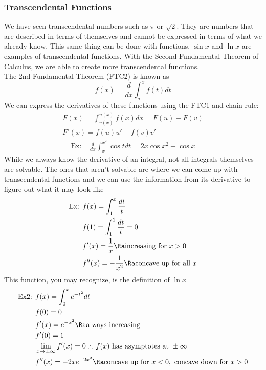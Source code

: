 \subsubsection{Transcendental Functions}
We have seen transcendental numbers such as $\pi$ or $\sqrt{2}$. They are numbers that are described in terms of themselves and cannot be expressed in terms of what we already know. This same thing can be done with functions. $\sin x$ and $\ln x$ are examples of transcendental functions. With the Second Fundamental Theorem of Calculus, we are able to create more transcendental functions.\\
The 2nd Fundamental Theorem (FTC2) is known as
$$f(x)=\frac{d}{dx}\int_a^xf(t)dt$$
We can express the derivatives of these functions using the FTC1 and chain rule:\\
\begin{align*}
    F(x)=\displaystyle{\int^{u(x)}_{v(x)}f(x)dx}=F(u)-F(v)\\
    F'(x)=f(u)u'-f(v)v'
\end{align*}
\begin{align*}
    \text{Ex: }&\frac{d}{dx}\int_x^{x^2}\cos t dt=2x\cos x^2-\cos x
\end{align*}
While we always know the derivative of an integral, not all integrals themselves are solvable. The ones that aren't solvable are where we can come up with transcendental functions and we can use the information from its derivative to figure out what it may look like
\begin{align*}
    \text{Ex: }&f(x)=\int_1^x\frac{dt}{t}\\
    &f(1)=\int_1^1\frac{dt}{t}=0\\
    &f'(x)=\frac{1}{x}\Ra\text{increasing for }x>0\\
    &f''(x)=-\frac{1}{x^2}\Ra\text{concave up for all }x
\end{align*}
This function, you may recognize, is the definition of $\ln x$
\begin{align*}
    \text{Ex2: }&f(x)=\int_0^xe^{-t^2}dt\\
    &f(0)=0\\
    &f'(x)=e^{-x^2}\Ra\text{always increasing}\\
    &f'(0)=1\\
    &\lim_{x\to\pm\infty}f'(x)=0\therefore\,f(x)\text{ has asymptotes at }\pm\infty\\
    &f''(x)=-2xe^{-2x^2}\Ra\text{concave up for }x<0,\text{ concave down for }x>0
\end{align*}
